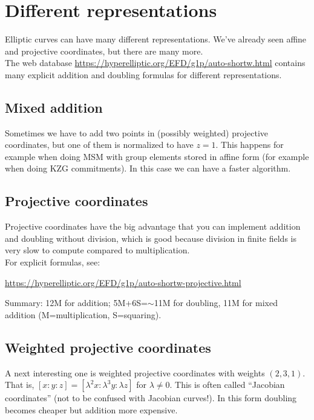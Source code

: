 \documentclass[12pt,draft,a4paper,openany,oneside]{amsbook}
\theoremstyle{plain}
\theoremstyle{definition}
\begin{document}
\section{Different representations}

Elliptic curves can have many different representations. We've already seen
affine and projective coordinates, but there are many more.\\

The web database \url{https://hyperelliptic.org/EFD/g1p/auto-shortw.html} 
contains many explicit addition and doubling formulas for different representations.

\subsection{Mixed addition}
Sometimes we have to add two points in (possibly weighted) projective coordinates,
but one of them is normalized to have $z=1$. This happens for example when doing MSM 
with group elements stored in affine form (for example when doing KZG commitments).
In this case we can have a faster algorithm.

\subsection{Projective coordinates} 
Projective coordinates have the big advantage
that you can implement addition and doubling without division, which is good
because division in finite fields is very slow to compute compared to multiplication.\\

For explicit formulas, see:

\noindent
\url{https://hyperelliptic.org/EFD/g1p/auto-shortw-projective.html}

\noindent
Summary: 12M for addition; 5M+6S=$\sim$11M for doubling,
11M for mixed addition (M=multiplication, S=squaring).

\subsection{Weighted projective coordinates} 
A next interesting one is weighted projective
coordinates with weights $(2,3,1)$. That is, $[x:y:z] = [\lambda^2x:\lambda^3y:\lambda z]$
for $\lambda\neq0$. This is often called ``Jacobian coordinates'' (not to be confused
with Jacobian curves!). In this form doubling becomes cheaper but addition more expensive.\\
\end{document}
